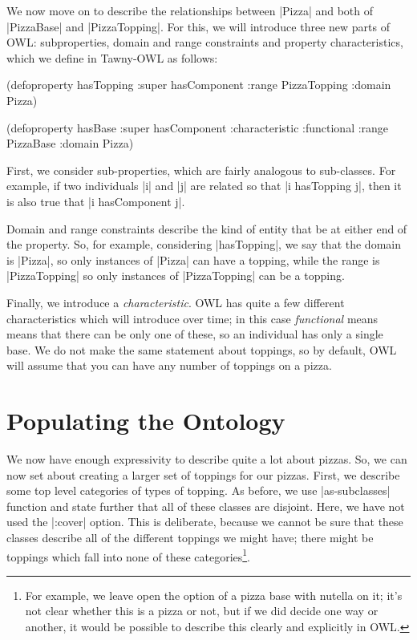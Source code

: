 We now move on to describe the relationships between |Pizza| and both of
|PizzaBase| and |PizzaTopping|. For this, we will introduce three new parts of
OWL: subproperties, domain and range constraints and property characteristics,
which we define in Tawny-OWL as follows:

\begin{tawny}
(defoproperty hasTopping
  :super hasComponent
  :range PizzaTopping
  :domain Pizza)

(defoproperty hasBase
  :super hasComponent
  :characteristic :functional
  :range PizzaBase
  :domain Pizza)
\end{tawny}

First, we consider sub-properties, which are fairly analogous to sub-classes.
For example, if two individuals |i| and |j| are related so that
|i hasTopping j|, then it is also true that |i hasComponent j|.

Domain and range constraints describe the kind of entity that be at either end
of the property. So, for example, considering |hasTopping|, we say that the
domain is |Pizza|, so only instances of |Pizza| can have a topping, while the
range is |PizzaTopping| so only instances of |PizzaTopping| can be a topping. 

Finally, we introduce a \emph{characteristic}. OWL has quite a few
different characteristics which will introduce over time; in this case
\emph{functional} means means that there can be only one of these, so
an individual has only a single base. We do not make the same
statement about toppings, so by default, OWL will assume that you can
have any number of toppings on a pizza.

\section{Populating the Ontology}
\label{sec:populating-ontology}

We now have enough expressivity to describe quite a lot about pizzas. So, we
can now set about creating a larger set of toppings for our pizzas. First, we
describe some top level categories of types of topping. As before, we use
|as-subclasses| function and state further that all of these classes are
disjoint. Here, we have not used the |:cover| option. This is deliberate,
because we cannot be sure that these classes describe all of the different
toppings we might have; there might be toppings which fall into none of these
categories\footnote{For example, we leave open the option of a pizza
  base with nutella on it; it's not clear whether this is a pizza or
  not, but if we did decide one way or another, it would be possible
  to describe this clearly and explicitly in OWL.}. 

